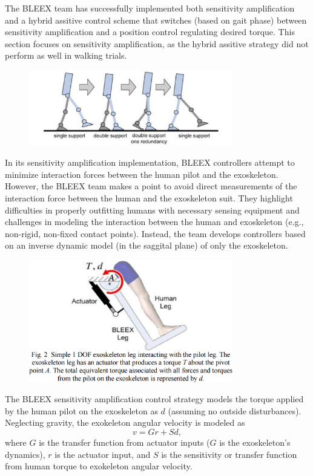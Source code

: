 \begin{refsection}
The BLEEX team has successfully implemented both sensitivity amplification \cite{sesitivityAmpPaper2005} and a hybrid assitive control scheme \cite{bleex_hybrid_control_2006} that switches (based on gait phase) between sensitivity amplification and a position control regulating desired torque. This section focuses on sensitivity amplification, as the hybrid assitive strategy did not perform as well in walking trials.

\begin{figure}[ht]
  \centering
  \includegraphics[width=3.5in]{exos/figs/bleex_support_phases.png}
\end{figure}

In its sensitivity amplification implementation, BLEEX controllers attempt to minimize interaction forces between the human pilot and the exoskeleton. However, the BLEEX team makes a point to avoid direct measurements of the interaction force between the human and the exoskeleton suit.  They highlight difficulties in properly outfitting humans with necessary sensing equipment and challenges in modeling the interaction between the human and exoskeleton (e.g., non-rigid, non-fixed contact points).  Instead, the team develops controllers based on an inverse dynamic model (in the saggital plane) of only the exoskeleton.  

\begin{figure}[ht]
  \centering
  \includegraphics[width=3.5in]{exos/figs/bleex_1dof_ex.png}
\end{figure}

The BLEEX sensitivity amplification control strategy models the torque applied by the human pilot on the exoskeleton as $d$ (assuming no outside disturbances).   Neglecting gravity, the exokeleton angular velocity is modeled as 
\[v = G r + S d ,\] 
where $G$ is the transfer function from actuator inputs ($G$ is the exoskeleton's dynamics), $r$ is the actuator input, and $S$ is the sensitivity or transfer function from human torque to exokeleton angular velocity. 


\end{refsection}
